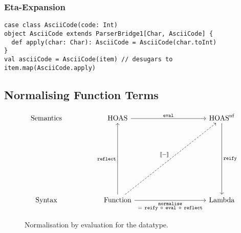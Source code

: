 \documentclass[../../main.tex]{subfiles}
\begin{document}
\subsubsection{Eta-Expansion}
\begin{verbatim}
case class AsciiCode(code: Int)
object AsciiCode extends ParserBridge1[Char, AsciiCode] {
  def apply(char: Char): AsciiCode = AsciiCode(char.toInt)
}
val asciiCode = AsciiCode(item) // desugars to item.map(AsciiCode.apply)
\end{verbatim}

\subsection{Normalising Function Terms}
\begin{figure}[htbp]
\begin{equation*}
\begin{tikzcd}[sep=5em]
  \text{Semantics} & \text{HOAS} \arrow[rr, "\texttt{eval}"]                                                                                                                                         &  & \text{HOAS}^\text{nf} \arrow[dd, "\texttt{reify}"] \\
                   &                                                                                                                                                                                 &  &                                                    \\
  \text{Syntax}    & \text{Function} \arrow[uu, "\texttt{reflect}"] \arrow[rr, "\substack{\texttt{normalise} \\ =\ \texttt{reify}\ \circ\ \texttt{eval}\ \circ\ \texttt{reflect}}"'] \arrow[rruu, "{\text{\textlbrackdbl} - \text{\textrbrackdbl}}", dashed] &  & \text{Lambda}                                     
\end{tikzcd}
\end{equation*}
\caption{Normalisation by evaluation for the  datatype.}
\end{figure}
\end{document}
